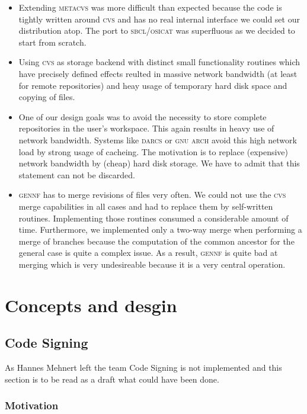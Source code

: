 \documentclass[fleqn, 10pt, a4paper]{report} \usepackage{amssymb}
\newcommand{\GENNF}{\textsc{gennf}}
\begin{document}
\begin{itemize}
\item Extending \textsc{metacvs} was more difficult than expected
  because the code is tightly written around \textsc{cvs} and has no
  real internal interface we could set our distribution atop.  The
  port to \textsc{sbcl}/\textsc{osicat} was superfluous as we decided
  to start from scratch.
\item Using \textsc{cvs} as storage backend with distinct small
  functionality routines which have precisely defined effects reulted
  in massive network bandwidth (at least for remote repositories) and
  heay usage of temporary hard disk space and copying of files.
\item One of our design goals was to avoid the necessity to store
  complete repositories in the user's workspace. This again results in
  heavy use of network bandwidth. Systems like \textsc{darcs} or
  \textsc{gnu arch} avoid this high network load by strong usage of
  cacheing. The motivation is to replace (expensive) network bandwidth
  by (cheap) hard disk storage. We have to admit that this statement
  can not be discarded.
\item \GENNF{} has to merge revisions of files very often. We could
  not use the \textsc{cvs} merge capabilities in all cases and had to
  replace them by self-written routines. Implementing those routines
  consumed a considerable amount of time.  Furthermore, we implemented
  only a two-way merge when performing a merge of branches because the
  computation of the common ancestor for the general case is quite a
  complex issue.  As a result, \GENNF{} is quite bad at merging which
  is very undesireable because it is a very central operation.
\end{itemize}


\chapter{Concepts and desgin}

\section{Code Signing \label{codesigning}}

As Hannes Mehnert left the team Code Signing is not implemented and
this section is to be read as a draft what could have been done.


\subsection{Motivation}
\end{document}

